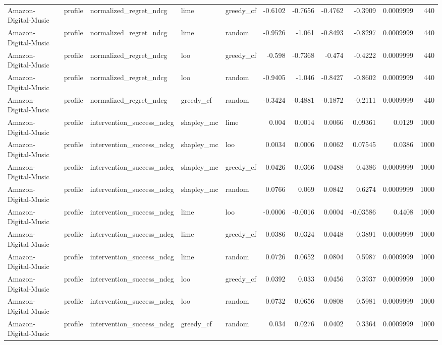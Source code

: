 \begin{table}[t]
\begin{tabular}{lllllrrrrrr}
Amazon-Digital-Music & profile & normalized\_regret\_ndcg & lime & greedy\_cf & -0.6102 & -0.7656 & -0.4762 & -0.3909 & 0.0009999 & 440 \\
Amazon-Digital-Music & profile & normalized\_regret\_ndcg & lime & random & -0.9526 & -1.061 & -0.8493 & -0.8297 & 0.0009999 & 440 \\
Amazon-Digital-Music & profile & normalized\_regret\_ndcg & loo & greedy\_cf & -0.598 & -0.7368 & -0.474 & -0.4222 & 0.0009999 & 440 \\
Amazon-Digital-Music & profile & normalized\_regret\_ndcg & loo & random & -0.9405 & -1.046 & -0.8427 & -0.8602 & 0.0009999 & 440 \\
Amazon-Digital-Music & profile & normalized\_regret\_ndcg & greedy\_cf & random & -0.3424 & -0.4881 & -0.1872 & -0.2111 & 0.0009999 & 440 \\
Amazon-Digital-Music & profile & intervention\_success\_ndcg & shapley\_mc & lime & 0.004 & 0.0014 & 0.0066 & 0.09361 & 0.0129 & 1000 \\
Amazon-Digital-Music & profile & intervention\_success\_ndcg & shapley\_mc & loo & 0.0034 & 0.0006 & 0.0062 & 0.07545 & 0.0386 & 1000 \\
Amazon-Digital-Music & profile & intervention\_success\_ndcg & shapley\_mc & greedy\_cf & 0.0426 & 0.0366 & 0.0488 & 0.4386 & 0.0009999 & 1000 \\
Amazon-Digital-Music & profile & intervention\_success\_ndcg & shapley\_mc & random & 0.0766 & 0.069 & 0.0842 & 0.6274 & 0.0009999 & 1000 \\
Amazon-Digital-Music & profile & intervention\_success\_ndcg & lime & loo & -0.0006 & -0.0016 & 0.0004 & -0.03586 & 0.4408 & 1000 \\
Amazon-Digital-Music & profile & intervention\_success\_ndcg & lime & greedy\_cf & 0.0386 & 0.0324 & 0.0448 & 0.3891 & 0.0009999 & 1000 \\
Amazon-Digital-Music & profile & intervention\_success\_ndcg & lime & random & 0.0726 & 0.0652 & 0.0804 & 0.5987 & 0.0009999 & 1000 \\
Amazon-Digital-Music & profile & intervention\_success\_ndcg & loo & greedy\_cf & 0.0392 & 0.033 & 0.0456 & 0.3937 & 0.0009999 & 1000 \\
Amazon-Digital-Music & profile & intervention\_success\_ndcg & loo & random & 0.0732 & 0.0656 & 0.0808 & 0.5981 & 0.0009999 & 1000 \\
Amazon-Digital-Music & profile & intervention\_success\_ndcg & greedy\_cf & random & 0.034 & 0.0276 & 0.0402 & 0.3364 & 0.0009999 & 1000 \\

\end{tabular}
\end{table}
